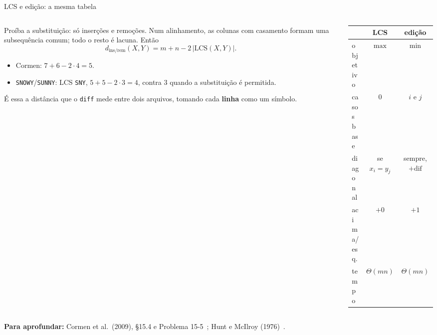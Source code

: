 \documentclass[aspectratio=169,xcolor=table]{beamer}
\newcommand{\fonte}[1]{%
  \vfill
  {\tiny\color{gray!55!black}\textbf{Para aprofundar:} #1\par}%
}
\begin{document}
\begin{frame}{LCS e edição: a mesma tabela}
  \begin{columns}[c]
    \begin{column}{0.54\textwidth}
      \scriptsize Proíba a substituição: só inserções e remoções. Num alinhamento, as colunas
      com casamento formam uma subsequência comum; todo o resto é lacuna. Então
      \[ d_{\text{ins/rem}}(X,Y) = m + n - 2\,|\mathrm{LCS}(X,Y)|. \]
      \begin{itemize}\scriptsize
        \item Cormen: $7 + 6 - 2\cdot 4 = 5$.
        \item \texttt{SNOWY}/\texttt{SUNNY}: LCS \texttt{SNY}, $5+5-2\cdot 3 = 4$, contra
              $3$ quando a substituição é permitida.
      \end{itemize}
      É essa a distância que o \texttt{diff} mede entre dois arquivos, tomando cada
      \textbf{linha} como um símbolo.
    \end{column}
    \begin{column}{0.42\textwidth}
      \centering\scriptsize
      \begin{tabular}{lcc}
        \toprule
        & LCS & edição \\
        \midrule
        objetivo & $\max$ & $\min$ \\
        casos base & $0$ & $i$ e $j$ \\
        diagonal & se $x_i = y_j$ & sempre, $+\mathrm{dif}$ \\
        acima/esq. & $+0$ & $+1$ \\
        tempo & $\Theta(mn)$ & $\Theta(mn)$ \\
        \bottomrule
      \end{tabular}
    \end{column}
  \end{columns}
  \fonte{Cormen et al.\ (2009), \S 15.4 e Problema 15-5~\cite{cormen2009introduction};
    Hunt e McIlroy (1976)~\cite{hunt1976algorithm}.}
\end{frame}
\end{document}
